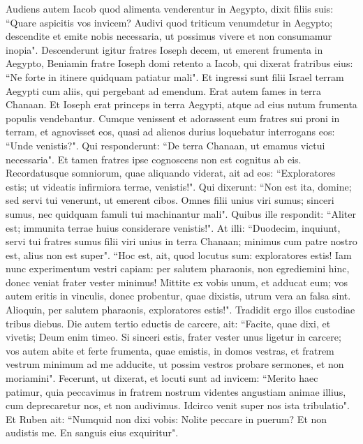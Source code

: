 \begin{biblechapter}  
\verse Audiens autem Iacob quod alimenta venderentur in Aegypto, dixit filiis suis: “Quare aspicitis vos invicem? 
\verse Audivi quod triticum venumdetur in Aegypto; descendite et emite nobis necessaria, ut possimus vivere et non consumamur inopia". 
\verse Descenderunt igitur fratres Ioseph decem, ut emerent frumenta in Aegypto,  
\verse Beniamin fratre Ioseph domi retento a Iacob, qui dixerat fratribus eius: “Ne forte in itinere quidquam patiatur mali". 
\verse Et ingressi sunt filii Israel terram Aegypti cum aliis, qui pergebant ad emendum. Erat autem fames in terra Chanaan. 
\verse Et Ioseph erat princeps in terra Aegypti, atque ad eius nutum frumenta populis vendebantur. Cumque venissent et adorassent eum fratres sui proni in terram,  
\verse et agnovisset eos, quasi ad alienos durius loquebatur interrogans eos: “Unde venistis?". Qui responderunt: “De terra Chanaan, ut emamus victui necessaria". 
\verse Et tamen fratres ipse cognoscens non est cognitus ab eis. 
\verse Recordatusque somniorum, quae aliquando viderat, ait ad eos: “Exploratores estis; ut videatis infirmiora terrae, venistis!". 
\verse Qui dixerunt: “Non est ita, domine; sed servi tui venerunt, ut emerent cibos. 
\verse Omnes filii unius viri sumus; sinceri sumus, nec quidquam famuli tui machinantur mali". 
\verse Quibus ille respondit: “Aliter est; immunita terrae huius considerare venistis!". 
\verse At illi: “Duodecim, inquiunt, servi tui fratres sumus filii viri unius in terra Chanaan; minimus cum patre nostro est, alius non est super". 
\verse “Hoc est, ait, quod locutus sum: exploratores estis! 
\verse Iam nunc experimentum vestri capiam: per salutem pharaonis, non egrediemini hinc, donec veniat frater vester minimus! 
\verse Mittite ex vobis unum, et adducat eum; vos autem eritis in vinculis, donec probentur, quae dixistis, utrum vera an falsa sint. Alioquin, per salutem pharaonis, exploratores estis!". 
\verse Tradidit ergo illos custodiae tribus diebus. 
\verse Die autem tertio eductis de carcere, ait: “Facite, quae dixi, et vivetis; Deum enim timeo. 
\verse Si sinceri estis, frater vester unus ligetur in carcere; vos autem abite et ferte frumenta, quae emistis, in domos vestras, 
\verse et fratrem vestrum minimum ad me adducite, ut possim vestros probare sermones, et non moriamini". Fecerunt, ut dixerat, 
\verse et locuti sunt ad invicem: “Merito haec patimur, quia peccavimus in fratrem nostrum videntes angustiam animae illius, cum deprecaretur nos, et non audivimus. Idcirco venit super nos ista tribulatio". 
\verse Et Ruben ait: “Numquid non dixi vobis: Nolite peccare in puerum? Et non audistis me. En sanguis eius exquiritur". 

\end{biblechapter}
